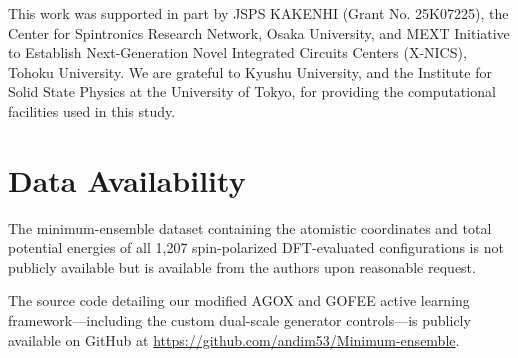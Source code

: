 
\begin{acknowledgments}
This work was supported in part by JSPS KAKENHI (Grant No. 25K07225), the Center for Spintronics Research Network, Osaka University, and MEXT Initiative to Establish Next-Generation Novel Integrated Circuits Centers (X-NICS), Tohoku University. We are grateful to Kyushu University, and the Institute for Solid State Physics at the University of Tokyo, for providing the computational facilities used in this study.
\end{acknowledgments}

\section*{Data Availability}
The minimum-ensemble dataset containing the atomistic coordinates and total potential energies of all 1,207 spin-polarized DFT-evaluated configurations is not publicly available but is available from the authors upon reasonable request.

The source code detailing our modified AGOX and GOFEE active learning framework—including the custom dual-scale generator controls—is publicly available on GitHub at \url{https://github.com/andim53/Minimum-ensemble}.